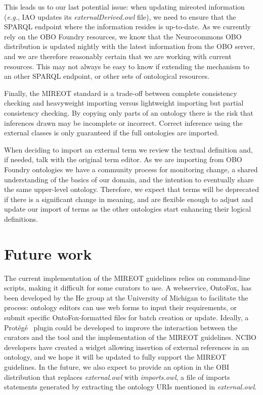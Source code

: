 \documentclass{ao2e}%
\newcommand{\protege}{Prot\'{e}g\'{e}}
\begin{document}
This leads us to our last potential issue: when updating mireoted information (\emph{e.g.}, \ac{IAO} updates its \emph{externalDerived.owl} file), we need to ensure that the SPARQL endpoint where the information resides is up-to-date. As we currently rely on the \ac{OBO} Foundry resources, we know that the Neurocommons \ac{OBO} distribution is updated nightly with the latest information from the \ac{OBO} server, and we are therefore reasonably certain that we are working with current resources. This may not always be easy to know if extending the mechanism to an other SPARQL endpoint, or other sets of ontological resources.

Finally, the \ac{MIREOT} standard is a trade-off between complete consistency checking and heavyweight importing versus lightweight importing but partial consistency checking.
By copying only parts of an ontology there is the risk that inferences drawn may be incomplete or incorrect. 
Correct inference using the external classes is only guaranteed if the full ontologies are imported.

When deciding to import an external term we review the textual definition and, if needed, talk with the original term editor.
As we are importing from \ac{OBO} Foundry ontologies we have a community process for monitoring change, a shared understanding of the basics of our domain, and the intention to eventually share the same upper-level ontology. 
Therefore, we expect that terms will be deprecated if there is a significant change in meaning, and are flexible enough to adjust and update our import of terms as the other ontologies start enhancing their logical definitions.



\section*{Future work}

The current implementation of the \ac{MIREOT} guidelines relies on command-line scripts, making it difficult for some curators to use. 
A webservice, OntoFox\cite{OntoFox}, has been developed by the He group at the University of Michigan to facilitate the process: ontology editors can use web forms to input their requirements, or submit specific OntoFox-formatted files for batch creation or update.
Ideally, a \protege\ \cite{Protege} plugin could be developed to improve the interaction between the curators and the tool and the implementation of the MIREOT guidelines. NCBO developers have created a widget allowing insertion of external references in an ontology\cite{NCBOWidget}, and we hope it will be updated to fully support the MIREOT guidelines.
In the future, we also expect to provide an option in the OBI distribution that replaces \emph{external.owl} with \emph{imports.owl}, a file of imports statements generated by extracting the ontology URIs mentioned in \emph{external.owl}.%
\end{document}
